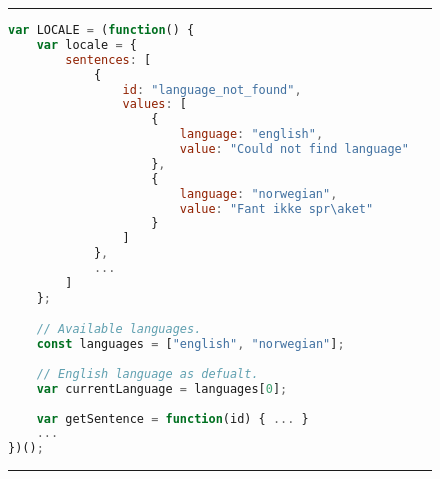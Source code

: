 \begin{figure}[H]
\noindent\rule{\textwidth}{1pt}
\begin{lstlisting}[language=JavaScript, caption={Language option functionality}, label={lst:locale}]
var LOCALE = (function() {
    var locale = {
        sentences: [
            {
                id: "language_not_found",
                values: [
                    {
                        language: "english",
                        value: "Could not find language"
                    },
                    {
                        language: "norwegian",
                        value: "Fant ikke spr\aket"
                    }
                ]
            },
            ...
        ]
    };

    // Available languages.
    const languages = ["english", "norwegian"];
    
    // English language as defualt.
    var currentLanguage = languages[0];
    
    var getSentence = function(id) { ... }
    ...
})();
\end{lstlisting}
\noindent\rule{\textwidth}{1pt}
\end{figure}